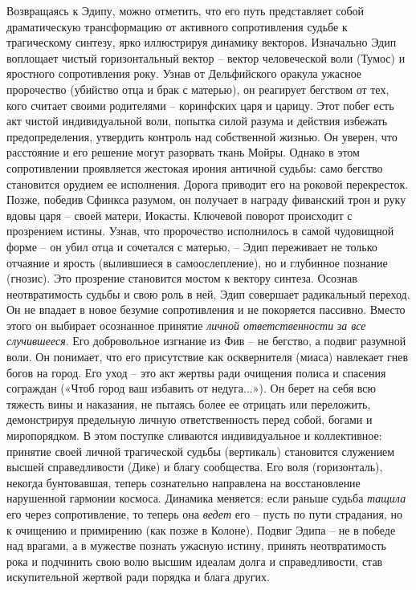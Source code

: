     Возвращаясь к Эдипу, можно отметить, что его путь представляет собой драматическую трансформацию от активного сопротивления судьбе к трагическому синтезу, ярко иллюстрируя динамику векторов. Изначально Эдип воплощает чистый горизонтальный вектор – вектор человеческой воли (Тумос) и яростного сопротивления року. Узнав от Дельфийского оракула ужасное пророчество (убийство отца и брак с матерью), он реагирует бегством от тех, кого считает своими родителями – коринфских царя и царицу. Этот побег есть акт чистой индивидуальной воли, попытка силой разума и действия избежать предопределения, утвердить контроль над собственной жизнью. Он уверен, что расстояние и его решение могут разорвать ткань Мойры. Однако в этом сопротивлении проявляется жестокая ирония античной судьбы: само бегство становится орудием ее исполнения. Дорога приводит его на роковой перекресток. Позже, победив Сфинкса разумом, он получает в награду фиванский трон и руку вдовы царя – своей матери, Иокасты.
    Ключевой поворот происходит с прозрением истины. Узнав, что пророчество исполнилось в самой чудовищной форме – он убил отца и сочетался с матерью, – Эдип переживает не только отчаяние и ярость (вылившиеся в самоослепление), но и глубинное познание (гнозис). Это прозрение становится мостом к вектору синтеза. Осознав неотвратимость судьбы и свою роль в ней, Эдип совершает радикальный переход. Он не впадает в новое безумие сопротивления и не покоряется пассивно. Вместо этого он выбирает осознанное принятие \textit{личной ответственности} \textit{за все случившееся}. Его добровольное изгнание из Фив – не бегство, а подвиг разумной воли. Он понимает, что его присутствие как осквернителя (миаса) навлекает гнев богов на город. Его уход – это акт жертвы ради очищения полиса и спасения сограждан («Чтоб город ваш избавить от недуга...»). Он берет на себя всю тяжесть вины и наказания, не пытаясь более ее отрицать или переложить, демонстрируя предельную личную ответственность перед собой, богами и миропорядком. В этом поступке сливаются индивидуальное и коллективное: принятие своей личной трагической судьбы (вертикаль) становится служением высшей справедливости (Дике) и благу сообщества. Его воля (горизонталь), некогда бунтовавшая, теперь сознательно направлена на восстановление нарушенной гармонии космоса. Динамика меняется: если раньше судьба \textit{тащила} его через сопротивление, то теперь она \textit{ведет} его – пусть по пути страдания, но к очищению и примирению (как позже в Колоне). Подвиг Эдипа – не в победе над врагами, а в мужестве познать ужасную истину, принять неотвратимость рока и подчинить свою волю высшим идеалам долга и справедливости, став искупительной жертвой ради порядка и блага других.
